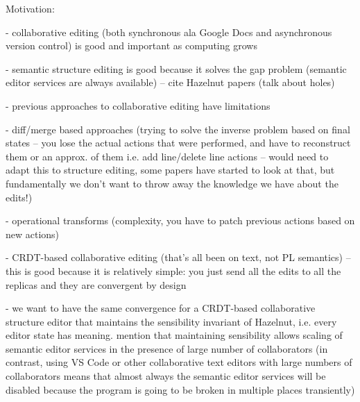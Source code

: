 



\newpage




Motivation:

- collaborative editing (both synchronous ala Google Docs and asynchronous version control)
is good and important as computing grows

- semantic structure editing is good because it solves the gap problem (semantic editor services
are always available) -- cite Hazelnut papers (talk about holes)

- previous approaches to collaborative editing have limitations

- diff/merge based approaches (trying to solve the inverse problem based on final states --
you lose the actual actions that were performed, and have to reconstruct them or an approx.
of them i.e. add line/delete line actions -- would need to adapt this to structure editing,
some papers have started to look at that, but fundamentally we don't want to throw away the
knowledge we have about the edits!)

- operational transforms (complexity, you have to patch previous actions based on new actions)

- CRDT-based collaborative editing (that's all been on text, not PL semantics) -- this is good
because it is relatively simple: you just send all the edits to all the replicas and they are
convergent by design

- we want to have the same convergence for a CRDT-based collaborative structure editor that maintains
the sensibility invariant of Hazelnut, i.e. every editor state has meaning. mention that maintaining sensibility
allows scaling of semantic editor services in the presence of large number of collaborators (in contrast,
using VS Code or other collaborative text editors with large numbers of collaborators means that almost always
the semantic editor services will be disabled because the program is going to be broken in multiple places
transiently)

